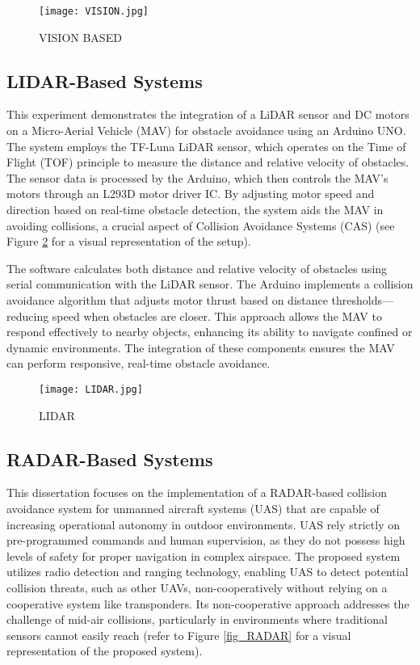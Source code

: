 \documentclass[12pt,twocolumn]{article}
\begin{document}
\begin{figure}[h]
\centering
\texttt{[image: VISION.jpg]}
\caption{VISION BASED}
\label{fig_VISION_Based}
\end{figure}

\subsection{LIDAR-Based Systems}

This experiment demonstrates the integration of a LiDAR sensor and DC motors on a Micro-Aerial Vehicle (MAV) for obstacle avoidance using an Arduino UNO. The system employs the TF-Luna LiDAR sensor, which operates on the Time of Flight (TOF) principle to measure the distance and relative velocity of obstacles. The sensor data is processed by the Arduino, which then controls the MAV's motors through an L293D motor driver IC. By adjusting motor speed and direction based on real-time obstacle detection, the system aids the MAV in avoiding collisions, a crucial aspect of Collision Avoidance Systems (CAS) (see Figure \ref{fig_LISP} for a visual representation of the setup).

The software calculates both distance and relative velocity of obstacles using serial communication with the LiDAR sensor. The Arduino implements a collision avoidance algorithm that adjusts motor thrust based on distance thresholds—reducing speed when obstacles are closer. This approach allows the MAV to respond effectively to nearby objects, enhancing its ability to navigate confined or dynamic environments. The integration of these components ensures the MAV can perform responsive, real-time obstacle avoidance.
\begin{figure}[h]
\centering
\texttt{[image: LIDAR.jpg]}
\caption{LIDAR}
\label{fig_LISP}
\end{figure}

\subsection{RADAR-Based Systems}
This dissertation focuses on the implementation of a RADAR-based collision avoidance system for unmanned aircraft systems (UAS) that are capable of increasing operational autonomy in outdoor environments. UAS rely strictly on pre-programmed commands and human supervision, as they do not possess high levels of safety for proper navigation in complex airspace. The proposed system utilizes radio detection and ranging technology, enabling UAS to detect potential collision threats, such as other UAVs, non-cooperatively without relying on a cooperative system like transponders. Its non-cooperative approach addresses the challenge of mid-air collisions, particularly in environments where traditional sensors cannot easily reach (refer to Figure \ref{fig_RADAR} for a visual representation of the proposed system).
\end{document}

